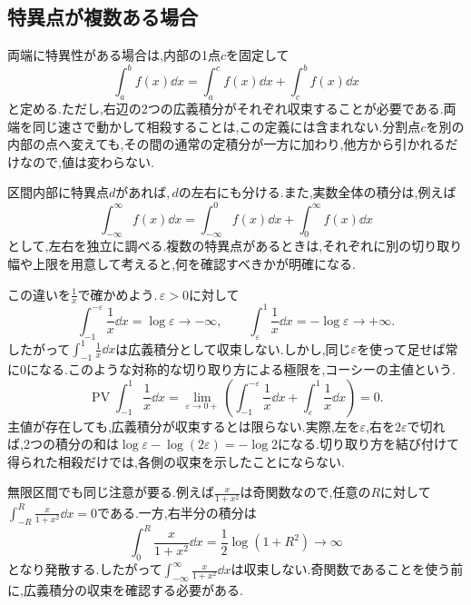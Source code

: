 \subsection{特異点が複数ある場合}

両端に特異性がある場合は,内部の1点$c$を固定して
\[
 \int_a^bf(x)\dd x
 =\int_a^cf(x)\dd x+\int_c^bf(x)\dd x
\]
と定める.ただし,右辺の2つの広義積分がそれぞれ収束することが必要である.両端を同じ速さで動かして相殺することは,この定義には含まれない.分割点$c$を別の内部の点へ変えても,その間の通常の定積分が一方に加わり,他方から引かれるだけなので,値は変わらない.

区間内部に特異点$d$があれば,\,$d$の左右にも分ける.また,実数全体の積分は,例えば
\[
 \int_{-\infty}^{\infty}f(x)\dd x
 =\int_{-\infty}^{0}f(x)\dd x+\int_0^{\infty}f(x)\dd x
\]
として,左右を独立に調べる.複数の特異点があるときは,それぞれに別の切り取り幅や上限を用意して考えると,何を確認すべきかが明確になる.

この違いを$\frac1x$で確かめよう.\,$\varepsilon>0$に対して
\[
 \int_{-1}^{-\varepsilon}\frac1x\dd x=\log\varepsilon\longrightarrow-\infty,
 \qquad
 \int_{\varepsilon}^{1}\frac1x\dd x=-\log\varepsilon\longrightarrow+\infty.
\]
したがって$\int_{-1}^1\frac1x\dd x$は広義積分として収束しない.しかし,同じ$\varepsilon$を使って足せば常に$0$になる.このような対称的な切り取り方による極限を,コーシーの主値という.
\[
 \operatorname{PV}\int_{-1}^1\frac1x\dd x
 =\lim_{\varepsilon\to0+}
 \left(\int_{-1}^{-\varepsilon}\frac1x\dd x
       +\int_{\varepsilon}^{1}\frac1x\dd x\right)=0.
\]
主値が存在しても,広義積分が収束するとは限らない.実際,左を$\varepsilon$,右を$2\varepsilon$で切れば,2つの積分の和は$\log\varepsilon-\log(2\varepsilon)=-\log2$になる.切り取り方を結び付けて得られた相殺だけでは,各側の収束を示したことにならない.

無限区間でも同じ注意が要る.例えば$\frac{x}{1+x^2}$は奇関数なので,任意の$R$に対して$\int_{-R}^R\frac{x}{1+x^2}\dd x=0$である.一方,右半分の積分は
\[
 \int_0^R\frac{x}{1+x^2}\dd x=\frac12\log(1+R^2)\longrightarrow\infty
\]
となり発散する.したがって$\int_{-\infty}^{\infty}\frac{x}{1+x^2}\dd x$は収束しない.奇関数であることを使う前に,広義積分の収束を確認する必要がある.



